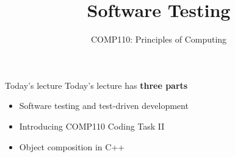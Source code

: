 \usepackage{../../beamerthemeFalmouthGamesAcademy}
\usepackage{multimedia}
\graphicspath{ {../../} }


\usepackage[normalem]{ulem}
\usepackage{wasysym}

\usepackage{pdfpages}


\title{Software Testing}   
\subtitle{COMP110: Principles of Computing}

\frame{\titlepage} 


\begin{frame}{Today's lecture}
    Today's lecture has \textbf{three parts}
    \begin{itemize}
        \item Software testing and test-driven development
        \item Introducing COMP110 Coding Task II
        \item Object composition in C++
    \end{itemize}
\end{frame}




%


